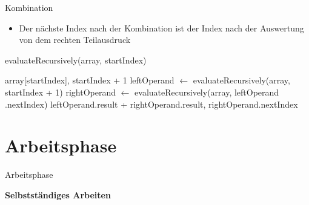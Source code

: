 \documentclass{../tuda-beamer}
\begin{document}
    \begin{frame}{Kombination}
        \begin{itemize}
            \item Der nächste Index nach der Kombination ist der Index nach der Auswertung von
            dem rechten Teilausdruck
        \end{itemize}

        \begin{algorithm}[H]
            \caption{evaluateRecursively(array, startIndex)}
            \begin{algorithmic}[1]
                    \State \Return array[startIndex], startIndex + 1
                \Else
                    \State leftOperand \(\leftarrow\) evaluateRecursively(array, startIndex + 1)
                    \State rightOperand \(\leftarrow\) evaluateRecursively(array, leftOperand
                    .nextIndex)
                    \State \Return leftOperand.result + rightOperand.result, rightOperand.nextIndex
                \EndIf
            \end{algorithmic}
        \end{algorithm}
    \end{frame}

    \begin{frame}[c]
        
    \end{frame}


    \section{Arbeitsphase}
    \begin{frame}[c]{Arbeitsphase}
        \begin{center}
            \textbf{\LARGE Selbstständiges Arbeiten}
        \end{center}
    \end{frame}
\end{document}
